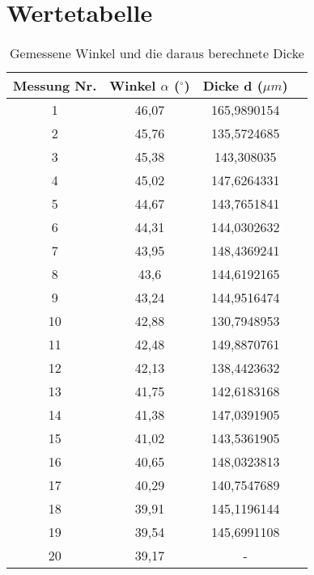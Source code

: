 \chapter{Wertetabelle}
\begin{table}[h]
  \centering
    \begin{tabular}{c|ccc}
    Messung Nr. & Winkel $\alpha$ ($^\circ$) & Dicke d ($\mu m$)\\\hline
    1 & 46,07 & 165,9890154 \\
    2 & 45,76 & 135,5724685 \\
    3 & 45,38 & 143,308035 \\
    4 & 45,02 & 147,6264331 \\
    5 & 44,67 & 143,7651841 \\
    6 & 44,31 & 144,0302632 \\
    7 & 43,95 & 148,4369241 \\
    8 & 43,6 & 144,6192165 \\
    9 & 43,24 & 144,9516474 \\
    10 & 42,88 & 130,7948953 \\
    11 & 42,48 & 149,8870761 \\
    12 & 42,13 & 138,4423632 \\
    13 & 41,75 & 142,6183168 \\
    14 & 41,38 & 147,0391905 \\
    15 & 41,02 & 143,5361905 \\
    16 & 40,65 & 148,0323813 \\
    17 & 40,29 & 140,7547689 \\
    18 & 39,91 & 145,1196144 \\
    19 & 39,54 & 145,6991108 \\
    20 & 39,17 & - \\
    \end{tabular}
  \caption{Gemessene Winkel und die daraus berechnete Dicke}
\end{table}